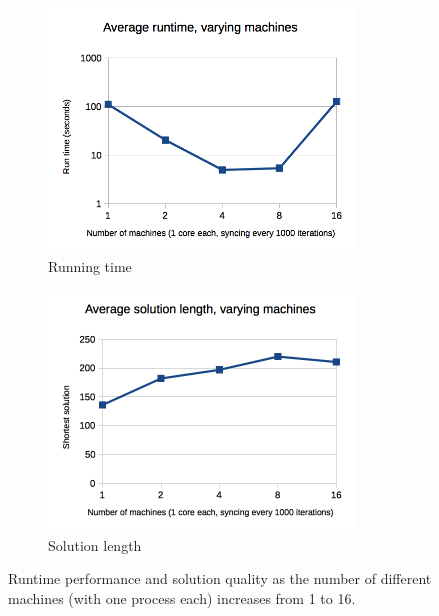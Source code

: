 \documentclass[11pt]{article}
\begin{document}
\begin{figure}
\centering
\begin{subfigure}{3.2in}
  \includegraphics[width=3.2in]{graphs/nummachines_runningtime}
  \caption{Running time}
  \label{fig:nummachines_runtime}
\end{subfigure}
\begin{subfigure}{3.2in}
  \includegraphics[width=3.2in]{graphs/nummachines_solutionquality}
  \caption{Solution length}
  \label{fig:nummachines_solnqual}
\end{subfigure}
\caption{Runtime performance and solution quality as the number of different machines (with one process each) increases from 1 to 16.}
\label{fig:nummachines}
\end{figure}
\end{document}

